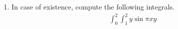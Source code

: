 \begin{question}
    \begin{enumerate}
        \item In case of existence, compute the following integrals.
        \begin{align}
            \int_0^2 \int_1^2 y \sin \pi x y
        \end{align}
    \end{enumerate}
\end{question}
